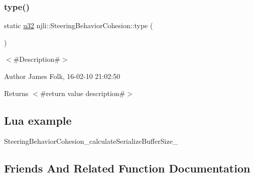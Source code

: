 \mbox{\label{classnjli_1_1_steering_behavior_cohesion_ab0d4fc92a137a32d7f82620427faf1f2}} 
\subsubsection{\texorpdfstring{type()}{type()}}
{\footnotesize\ttfamily static \mbox{\hyperlink{_util_8h_a10e94b422ef0c20dcdec20d31a1f5049}{u32}} njli\+::\+Steering\+Behavior\+Cohesion\+::type (\begin{DoxyParamCaption}{ }\end{DoxyParamCaption})\hspace{0.3cm}{\ttfamily [static]}}



$<$\#\+Description\#$>$ 

\begin{DoxyAuthor}{Author}
James Folk, 16-\/02-\/10 21\+:02\+:50
\end{DoxyAuthor}
\begin{DoxyReturn}{Returns}
$<$\#return value description\#$>$
\end{DoxyReturn}
\hypertarget{classnjli_1_1_steering_behavior_wander_ex1}{}\subsection{Lua example}\label{classnjli_1_1_steering_behavior_wander_ex1}

\begin{DoxyCodeInclude}
\end{DoxyCodeInclude}
Steering\+Behavior\+Cohesion\+\_\+calculate\+Serialize\+Buffer\+Size\+\_\+ 

\subsection{Friends And Related Function Documentation}
\mbox{\label{classnjli_1_1_steering_behavior_cohesion_acb96ebb09abe8f2a37a915a842babfac}} 
